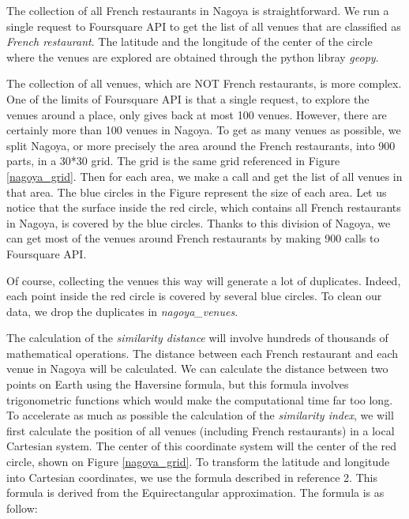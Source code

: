\documentclass[12pt,a4paper]{article}
\begin{document}
The collection of all French restaurants in Nagoya is straightforward. We run a single request to Foursquare API to get the list of all venues that are classified as \textit{French restaurant}. The latitude and the longitude of the center of the circle where the venues are explored are obtained through the python libray \textit{geopy}.

\medskip

The collection of all venues, which are NOT French restaurants, is more complex. One of the limits of Foursquare API is that a single request, to explore the venues around a place, only gives back at most 100 venues. However, there are certainly more than 100 venues in Nagoya. To get as many venues as possible, we split Nagoya, or more precisely the area around the French restaurants, into 900 parts, in a 30*30 grid. The grid is the same grid referenced in Figure \ref{nagoya_grid}. Then for each area, we make a call and get the list of all venues in that area. The blue circles in the Figure represent the size of each area. Let us notice that the surface inside the red circle, which contains all French restaurants in Nagoya, is covered by the blue circles. Thanks to this division of Nagoya, we can get most of the venues around French restaurants by making 900 calls to Foursquare API.

\medskip

Of course, collecting the venues this way will generate a lot of duplicates. Indeed, each point inside the red circle is covered by several blue circles. To clean our data, we drop the duplicates in \textit{nagoya\_venues}.

\medskip

The calculation of the \textit{similarity distance} will involve hundreds of thousands of mathematical operations. The distance between each French restaurant and each venue in Nagoya will be calculated. We can calculate the distance between two points on Earth using the Haversine formula, but this formula involves trigonometric functions which would make the computational time far too long. To accelerate as much as possible the calculation of the \textit{similarity index}, we will first calculate the position of all venues (including French restaurants) in a local Cartesian system. The center of this coordinate system will the center of the red circle, shown on Figure \ref{nagoya_grid}. To transform the latitude and longitude into Cartesian coordinates, we use the formula described in reference 2. This formula is derived from the Equirectangular approximation. The formula is as follow:
\end{document}
